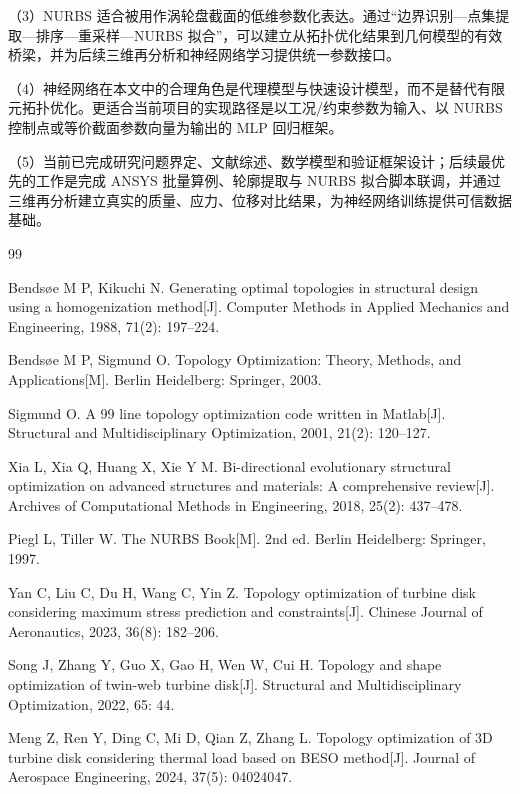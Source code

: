 \documentclass{FRB-style}
\begin{document}
（3）NURBS 适合被用作涡轮盘截面的低维参数化表达。通过“边界识别—点集提取—排序—重采样—NURBS 拟合”，可以建立从拓扑优化结果到几何模型的有效桥梁，并为后续三维再分析和神经网络学习提供统一参数接口。

（4）神经网络在本文中的合理角色是代理模型与快速设计模型，而不是替代有限元拓扑优化。更适合当前项目的实现路径是以工况/约束参数为输入、以 NURBS 控制点或等价截面参数向量为输出的 MLP 回归框架。

（5）当前已完成研究问题界定、文献综述、数学模型和验证框架设计；后续最优先的工作是完成 ANSYS 批量算例、轮廓提取与 NURBS 拟合脚本联调，并通过三维再分析建立真实的质量、应力、位移对比结果，为神经网络训练提供可信数据基础。

\clearpage
{}
\begin{thebibliography}{99}

Bends{\o}e M P, Kikuchi N. Generating optimal topologies in structural design using a homogenization method[J]. Computer Methods in Applied Mechanics and Engineering, 1988, 71(2): 197--224.

Bends{\o}e M P, Sigmund O. Topology Optimization: Theory, Methods, and Applications[M]. Berlin Heidelberg: Springer, 2003.

Sigmund O. A 99 line topology optimization code written in Matlab[J]. Structural and Multidisciplinary Optimization, 2001, 21(2): 120--127.

Xia L, Xia Q, Huang X, Xie Y M. Bi-directional evolutionary structural optimization on advanced structures and materials: A comprehensive review[J]. Archives of Computational Methods in Engineering, 2018, 25(2): 437--478.

Piegl L, Tiller W. The NURBS Book[M]. 2nd ed. Berlin Heidelberg: Springer, 1997.

Yan C, Liu C, Du H, Wang C, Yin Z. Topology optimization of turbine disk considering maximum stress prediction and constraints[J]. Chinese Journal of Aeronautics, 2023, 36(8): 182--206.

Song J, Zhang Y, Guo X, Gao H, Wen W, Cui H. Topology and shape optimization of twin-web turbine disk[J]. Structural and Multidisciplinary Optimization, 2022, 65: 44.

Meng Z, Ren Y, Ding C, Mi D, Qian Z, Zhang L. Topology optimization of 3D turbine disk considering thermal load based on BESO method[J]. Journal of Aerospace Engineering, 2024, 37(5): 04024047.


\end{thebibliography}
\end{document}
